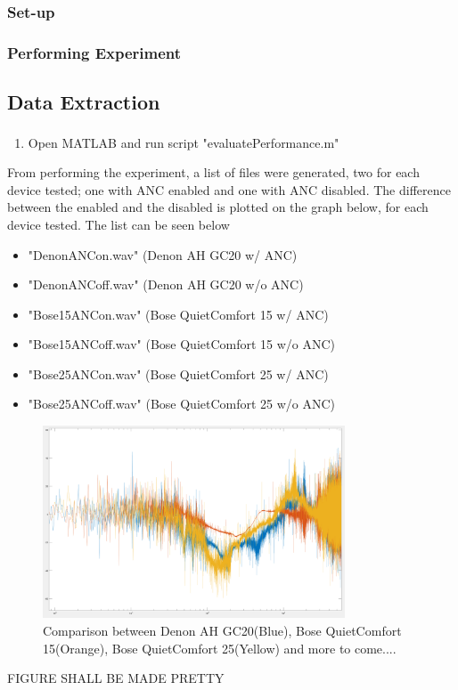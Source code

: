 	\subsubsection{Set-up}
	\subsubsection{Performing Experiment}
	
\subsection{Data Extraction}
\begin{enumerate}
	\item Open MATLAB\textsuperscript{\textregistered} and run script "evaluatePerformance.m"
\end{enumerate}

From performing the experiment, a list of files were generated, two for each device tested; one with ANC enabled and one with ANC disabled.
The difference between the enabled and the disabled is plotted on the graph below, for each device tested. The list can be seen below

\begin{itemize}
	\item "DenonANCon.wav"		(Denon AH GC20 w/ ANC)
	\item "DenonANCoff.wav"		(Denon AH GC20 w/o ANC)
	\item "Bose15ANCon.wav"		(Bose QuietComfort 15 w/ ANC)
	\item "Bose15ANCoff.wav"	(Bose QuietComfort 15 w/o ANC)
	\item "Bose25ANCon.wav"		(Bose QuietComfort 25 w/ ANC)
	\item "Bose25ANCoff.wav"	(Bose QuietComfort 25 w/o ANC)
\end{itemize}


\begin{figure}[H]
	\centering
	\includegraphics[width=0.8\textwidth]{../Journal/Experiments/TestofConsumerHeadphones/OtherBrandsComparison.png}
	\caption{Comparison between Denon AH GC20(Blue), Bose QuietComfort 15(Orange), Bose QuietComfort 25(Yellow) and more to come....}
	\label{OtherBrandsTest}
\end{figure}
FIGURE SHALL BE MADE PRETTY


